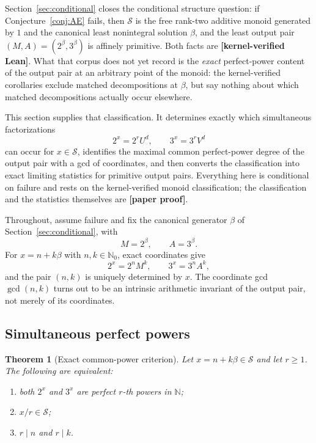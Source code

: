 \documentclass[11pt,oneside]{article}
\newtheorem{theorem}{Theorem}[section]
\theoremstyle{definition}
\theoremstyle{remark}
\newcommand{\N}{\mathbb N}
\newcommand{\Nzero}{\mathbb N_0}
\newcommand{\Sol}{\mathcal S}
\newcommand{\statuslean}{\textcolor{leanblue}{\textbf{[kernel-verified Lean]}}}
\newcommand{\statusnew}{\textcolor{newgreen}{\textbf{[paper proof]}}}
\begin{document}
Section~\ref{sec:conditional} closes the conditional structure question: if
Conjecture~\ref{conj:AE} fails, then $\Sol$ is the free rank-two additive monoid generated by
$1$ and the canonical least nonintegral solution $\beta$, and the least output pair
$(M,A)=(2^{\beta},3^{\beta})$ is affinely primitive.  Both facts are \statuslean{}.  What that
corpus does not yet record is the \emph{exact} perfect-power content of the output pair at an
arbitrary point of the monoid: the kernel-verified corollaries exclude matched decompositions
at $\beta$, but say nothing about which matched decompositions actually occur elsewhere.

This section supplies that classification.  It determines exactly which simultaneous
factorizations
\[
 2^x=2^rU^d,\qquad 3^x=3^rV^d
\]
can occur for $x\in\Sol$, identifies the maximal common perfect-power degree of the output
pair with a gcd of coordinates, and then converts the classification into exact limiting
statistics for primitive output pairs.  Everything here is conditional on failure and rests on
the kernel-verified monoid classification; the classification and the statistics themselves are
\statusnew{}.

Throughout, assume failure and fix the canonical generator $\beta$ of
Section~\ref{sec:conditional}, with
\[
 M=2^{\beta},\qquad A=3^{\beta}.
\]
For $x=n+k\beta$ with $n,k\in\Nzero$, exact coordinates give
\begin{equation}
 2^x=2^nM^k,
 \qquad
 3^x=3^nA^k,
\label{pp:eq-output-coordinates}
\end{equation}
and the pair $(n,k)$ is uniquely determined by $x$.  The coordinate gcd $\gcd(n,k)$ turns out
to be an intrinsic arithmetic invariant of the output pair, not merely of its coordinates.

\subsection{Simultaneous perfect powers}

\begin{theorem}[Exact common-power criterion]
\label{pp:common-power}
Let $x=n+k\beta\in\Sol$ and let $r\ge1$.  The following are equivalent:
\begin{enumerate}[label=\textup{(\roman*)}]
\item both $2^x$ and $3^x$ are perfect $r$-th powers in $\N$;
\item $x/r\in\Sol$;
\item $r\mid n$ and $r\mid k$.
\end{enumerate}
\end{theorem}
\end{document}
